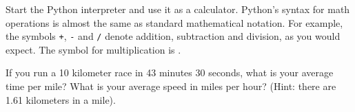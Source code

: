 \begin{exercise}
	Start the Python interpreter and use it as a calculator.
	Python's syntax for math operations is almost the same as
	standard mathematical notation.  For example, the symbols
	{\tt +}, {\tt -} and {\tt /} denote addition, subtraction
	and division, as you would expect.  The symbol for
	multiplication is {\tt *}.
	
	If you run a 10 kilometer race in 43 minutes 30 seconds, what is your
	average time per mile?  What is your average speed in miles per hour?
	(Hint: there are 1.61 kilometers in a mile).
	
	
\end{exercise}
